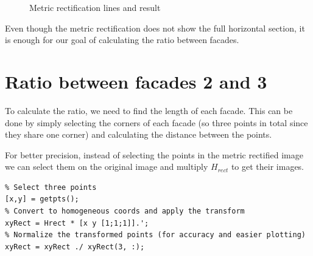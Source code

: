 \documentclass{Configuration_Files/PoliMi3i_thesis}
\begin{document}
\begin{figure}[H]
    \centering
    \quad
    \caption{Metric rectification lines and result}
    \label{fig:g1_metric}
\end{figure}

Even though the metric rectification does not show the full horizontal section, it is enough for our goal of calculating the ratio between facades.

\section{Ratio between facades 2 and 3}

To calculate the ratio, we need to find the length of each facade. This can be done by simply selecting the corners of each facade (so three points in total since they share one corner) and calculating the distance between the points.

For better precision, instead of selecting the points in the metric rectified image we can select them on the original image and multiply $H_{rect}$ to get their images.

\begin{verbatim}
% Select three points
[x,y] = getpts();
% Convert to homogeneous coords and apply the transform
xyRect = Hrect * [x y [1;1;1]].';
% Normalize the transformed points (for accuracy and easier plotting)
xyRect = xyRect ./ xyRect(3, :); 	
\end{verbatim}
\end{document}

